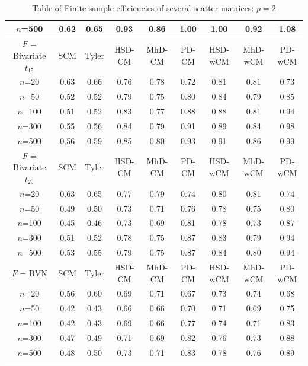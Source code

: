 \documentclass[fleqn,12pt]{article}
\begin{document}
\begin{table}
\begin{footnotesize}
\begin{tabular}{c|cc|ccc|ccc}
    $n$=500                  & 0.62 & 0.65  & 0.93   & 0.86   & 1.00  & 1.00    & 0.92    & 1.08   \\ \hline
    $F$ = Bivariate $t_{15}$ & SCM  & Tyler & HSD-CM & MhD-CM & PD-CM & HSD-wCM & MhD-wCM & PD-wCM \\ \hline
    $n$=20                   & 0.63 & 0.66  & 0.76   & 0.78   & 0.72  & 0.81    & 0.81    & 0.73   \\
    $n$=50                   & 0.52 & 0.52  & 0.79   & 0.75   & 0.80  & 0.84    & 0.79    & 0.85   \\
    $n$=100                  & 0.51 & 0.52  & 0.83   & 0.77   & 0.88  & 0.88    & 0.81    & 0.94   \\
    $n$=300                  & 0.55 & 0.56  & 0.84   & 0.79   & 0.91  & 0.89    & 0.84    & 0.98   \\
    $n$=500                  & 0.56 & 0.59  & 0.85   & 0.80   & 0.93  & 0.91    & 0.86    & 0.99   \\ \hline
    $F$ = Bivariate $t_{25}$ & SCM  & Tyler & HSD-CM & MhD-CM & PD-CM & HSD-wCM & MhD-wCM & PD-wCM \\ \hline
    $n$=20                   & 0.63 & 0.65  & 0.77   & 0.79   & 0.74  & 0.80    & 0.81    & 0.74   \\
    $n$=50                   & 0.49 & 0.50  & 0.73   & 0.71   & 0.76  & 0.78    & 0.75    & 0.80   \\
    $n$=100                  & 0.45 & 0.46  & 0.73   & 0.69   & 0.81  & 0.78    & 0.73    & 0.87   \\
    $n$=300                  & 0.51 & 0.52  & 0.78   & 0.75   & 0.87  & 0.83    & 0.79    & 0.94   \\
    $n$=500                  & 0.53 & 0.55  & 0.79   & 0.75   & 0.87  & 0.84    & 0.80    & 0.94   \\ \hline
    $F$ = BVN                & SCM  & Tyler & HSD-CM & MhD-CM & PD-CM & HSD-wCM & MhD-wCM & PD-wCM \\ \hline
    $n$=20                   & 0.56 & 0.60  & 0.69   & 0.71   & 0.67  & 0.73    & 0.74    & 0.68   \\
    $n$=50                   & 0.42 & 0.43  & 0.66   & 0.66   & 0.70  & 0.71    & 0.69    & 0.75   \\
    $n$=100                  & 0.42 & 0.43  & 0.69   & 0.66   & 0.77  & 0.74    & 0.71    & 0.83   \\
    $n$=300                  & 0.47 & 0.49  & 0.71   & 0.69   & 0.82  & 0.76    & 0.73    & 0.88   \\
    $n$=500                  & 0.48 & 0.50  & 0.73   & 0.71   & 0.83  & 0.78    & 0.76    & 0.89   \\ \hline
    \end{tabular}
\end{footnotesize}
\caption{Table of Finite sample efficiencies of several scatter matrices: $p=2$}
\label{table:FSEtable2}
\end{table}
\end{document}
